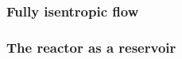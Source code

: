 \subsubsection{Fully isentropic flow}

\todo{}


\subsubsection{The reactor as a reservoir}

\subsubsection{}
